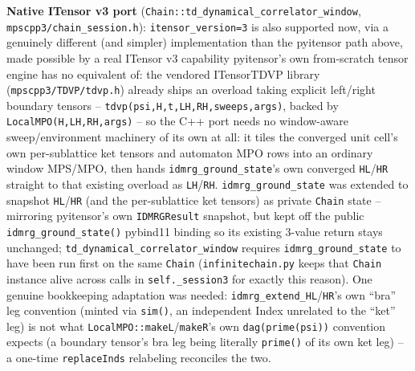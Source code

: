 \documentclass[11pt]{article}
\begin{document}
\textbf{Native ITensor v3 port} (\texttt{Chain::td\_dynamical\_correlator\_window},
\texttt{mpscpp3/chain\_session.h}): \texttt{itensor\_version=3} is also
supported now, via a genuinely different (and simpler) implementation
than the pyitensor path above, made possible by a real ITensor v3
capability pyitensor's own from-scratch tensor engine has no equivalent
of: the vendored ITensorTDVP library (\texttt{mpscpp3/TDVP/tdvp.h})
already ships an overload taking explicit left/right boundary tensors --
\texttt{tdvp(psi,H,t,LH,RH,sweeps,args)}, backed by
\texttt{LocalMPO(H,LH,RH,args)} -- so the C++ port needs no window-aware
sweep/environment machinery of its own at all: it tiles the converged
unit cell's own per-sublattice ket tensors and automaton MPO rows into an
ordinary window MPS/MPO, then hands \texttt{idmrg\_ground\_state}'s own
converged \texttt{HL}/\texttt{HR} straight to that existing overload as
\texttt{LH}/\texttt{RH}. \texttt{idmrg\_ground\_state} was extended to
snapshot \texttt{HL}/\texttt{HR} (and the per-sublattice ket tensors) as
private \texttt{Chain} state -- mirroring pyitensor's own
\texttt{IDMRGResult} snapshot, but kept off the public
\texttt{idmrg\_ground\_state()} pybind11 binding so its existing 3-value
return stays unchanged; \texttt{td\_dynamical\_correlator\_window}
requires \texttt{idmrg\_ground\_state} to have been run first on the same
\texttt{Chain} (\texttt{infinitechain.py} keeps that \texttt{Chain}
instance alive across calls in \texttt{self.\_session3} for exactly this
reason). One genuine bookkeeping adaptation was needed:
\texttt{idmrg\_extend\_HL}/\texttt{HR}'s own ``bra'' leg convention
(minted via \texttt{sim()}, an independent Index unrelated to the
``ket'' leg) is not what \texttt{LocalMPO::makeL}/\texttt{makeR}'s own
\texttt{dag(prime(psi))} convention expects (a boundary tensor's bra leg
being literally \texttt{prime()} of its own ket leg) -- a one-time
\texttt{replaceInds} relabeling reconciles the two.
\end{document}
